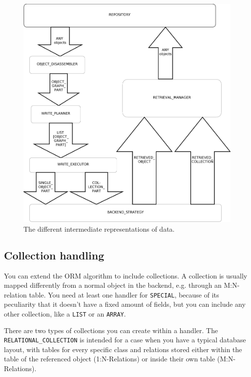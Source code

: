 \begin{figure} [h!]
\centering
\includegraphics[trim= 0mm -10mm 0mm -10mm,clip, width = 13cm] {includes/dataflow.png}
\caption{The different intermediate representations of data.}
\label{fig:intermediate_data_orm}
\end{figure}



\subsection{Collection handling}

You can extend the ORM algorithm to include collections. A collection is usually mapped differently from a normal object in the backend, e.g. through an M:N-relation table.
You need at least one handler for \lstinline!SPECIAL!, because of its peculiarity that it doesn't have a fixed amount of fields, but you can include any other collection, like a \lstinline!LIST! or an \lstinline!ARRAY!.

There are two types of collections you can create within a handler. 
The \lstinline!RELATIONAL_COLLECTION! is intended for a case when you have a typical database layout, 
with tables for every specific class and relations stored either within the table of the referenced object (1:N-Relations) or inside their own table (M:N-Relations).

